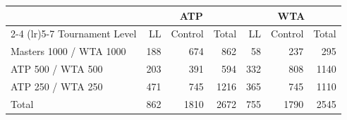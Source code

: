 \begin{tabular}{l rrr rrr}
\toprule
 & \multicolumn{3}{c}{ATP} & \multicolumn{3}{c}{WTA} \\
\cmidrule(lr){2-4} \cmidrule(lr){5-7}
Tournament Level & LL & Control & Total & LL & Control & Total \\
\midrule
Masters 1000 / WTA 1000 & 188 & 674 & 862 & 58 & 237 & 295 \\
ATP 500 / WTA 500 & 203 & 391 & 594 & 332 & 808 & 1140 \\
ATP 250 / WTA 250 & 471 & 745 & 1216 & 365 & 745 & 1110 \\
\midrule
Total & 862 & 1810 & 2672 & 755 & 1790 & 2545 \\
\bottomrule
\end{tabular}
